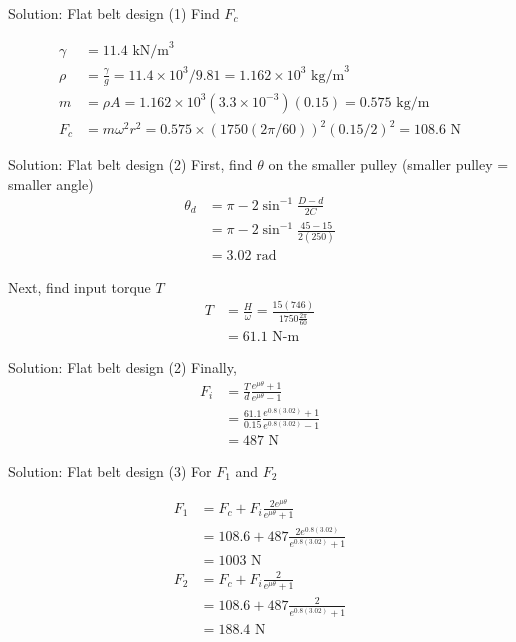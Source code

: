 \documentclass[10pt, svgnames]{beamer}
\begin{document}
\begin{frame}[label={sec:org03fa7b0}]{Solution: Flat belt design (1)}
Find \(F_c\)

\begin{align*}
\gamma &= 11.4 \text{ kN/m}^3 \\
\rho &= \frac{\gamma}{g} = 11.4 \times 10^3 / 9.81 = 1.162 \times 10^3 \text{ kg/m}^3 \\
m &= \rho A = 1.162 \times 10^3 (3.3 \times 10^{-3})(0.15) = 0.575 \text{ kg/m} \\
F_c &= m \omega^2 r^2 = 0.575 \times (1750 (2\pi/60))^2 (0.15/2)^2 = 108.6 \text{ N}
\end{align*}
\end{frame}

\begin{frame}[label={sec:org6b379a6}]{Solution: Flat belt design (2)}
First, find \(\theta\) on the smaller pulley (smaller pulley = smaller angle)
\begin{align*}
    \theta_{d} &= \pi - 2\sin^{-1}\frac{D-d}{2C} \\
               &= \pi - 2\sin^{-1}\frac{45 - 15}{2(250)} \\
               &= 3.02 \text{ rad}
\end{align*}

Next, find input torque \(T\)
\begin{align*}
    T &= \frac{H}{\omega} = \frac{15(746)}{1750\frac{2\pi}{60}} \\
      &= 61.1 \text{ N-m}
\end{align*}
\end{frame}

\begin{frame}[label={sec:orga06803b}]{Solution: Flat belt design (2)}
Finally,
\begin{align*}
    F_{i} &= \frac{T}{d}\frac{e^{\mu\theta} + 1}{e^{\mu\theta} - 1} \\
          &= \frac{61.1}{0.15}\frac{e^{0.8(3.02)} + 1}{e^{0.8(3.02)} - 1} \\
          &= 487 \text{ N}
\end{align*}
\end{frame}

\begin{frame}[label={sec:org9509d9a}]{Solution: Flat belt design (3)}
For \(F_1\) and \(F_2\)

\begin{align*}
    F_{1} &= F_{c} + F_{i} \frac{2e^{\mu\theta}}{e^{\mu\theta}+1} \\
         &= 108.6 + 487\frac{2e^{0.8(3.02)}}{e^{0.8(3.02)}+ 1} \\
         &= 1003 \text{ N} \\
    F_{2} &= F_{c} + F_{i} \frac{2}{e^{\mu\theta}+1} \\
         &= 108.6 + 487\frac{2}{e^{0.8(3.02)}+ 1} \\
         &= 188.4 \text{ N}
\end{align*}
\end{frame}
\end{document}
